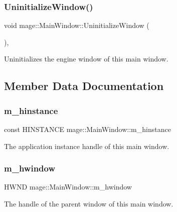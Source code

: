 \subsubsection{\texorpdfstring{Uninitialize\+Window()}{UninitializeWindow()}}
{\footnotesize\ttfamily void mage\+::\+Main\+Window\+::\+Uninitialize\+Window (\begin{DoxyParamCaption}{ }\end{DoxyParamCaption})\hspace{0.3cm}{\ttfamily [private]}, {\ttfamily [noexcept]}}

Uninitializes the engine window of this main window. 

\subsection{Member Data Documentation}
\hypertarget{classmage_1_1_main_window_a314759bf324579b568528bbf99bc5c7f}{}\label{classmage_1_1_main_window_a314759bf324579b568528bbf99bc5c7f} 
\subsubsection{\texorpdfstring{m\+\_\+hinstance}{m\_hinstance}}
{\footnotesize\ttfamily const H\+I\+N\+S\+T\+A\+N\+CE mage\+::\+Main\+Window\+::m\+\_\+hinstance\hspace{0.3cm}{\ttfamily [private]}}

The application instance handle of this main window. \hypertarget{classmage_1_1_main_window_afc9afabcf8a52d79f02c8352451863cc}{}\label{classmage_1_1_main_window_afc9afabcf8a52d79f02c8352451863cc} 
\subsubsection{\texorpdfstring{m\+\_\+hwindow}{m\_hwindow}}
{\footnotesize\ttfamily H\+W\+ND mage\+::\+Main\+Window\+::m\+\_\+hwindow\hspace{0.3cm}{\ttfamily [private]}}

The handle of the parent window of this main window. 